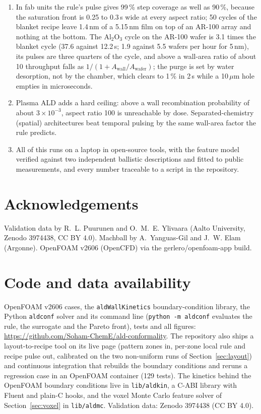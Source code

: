 \documentclass[11pt,letterpaper]{article}
\newcommand{\Awall}{A_{\mathrm{wall}}/A_{\mathrm{wafer}}}
\begin{document}
\begin{enumerate}
\item In fab units the rule's pulse gives 99\,\% step coverage as well as 90\,\%, because the saturation front is 0.25 to 0.3\,s wide at every aspect ratio; 50 cycles of the blanket recipe leave 1.4\,nm of a 5.15\,nm film on top of an AR-100 array and nothing at the bottom. The Al$_2$O$_3$ cycle on the AR-100 wafer is 3.1 times the blanket cycle (37.6 against 12.2\,s; 1.9 against 5.5 wafers per hour for 5\,nm), its pulses are three quarters of the cycle, and above a wall-area ratio of about 10 throughput falls as $1/(1 + \Awall)$; the purge is set by water desorption, not by the chamber, which clears to 1\,\% in 2\,s while a 10\,$\mu$m hole empties in microseconds.
\item Plasma ALD adds a hard ceiling: above a wall recombination probability of about $3\times10^{-3}$, aspect ratio 100 is unreachable by dose. Separated-chemistry (spatial) architectures beat temporal pulsing by the same wall-area factor the rule predicts.
\item All of this runs on a laptop in open-source tools, with the feature model verified against two independent ballistic descriptions and fitted to public measurements, and every number traceable to a script in the repository.
\end{enumerate}

\section*{Acknowledgements}
Validation data by R.~L. Puurunen and O.~M.~E. Ylivaara (Aalto University, Zenodo 3974438, CC BY 4.0). Machball by A.~Yanguas-Gil and J.~W. Elam (Argonne). OpenFOAM v2606 (OpenCFD) via the gerlero/openfoam-app build.

\section*{Code and data availability}
OpenFOAM v2606 cases, the \texttt{aldWallKinetics} boundary-condition library, the Python \texttt{aldconf} solver and its command line (\texttt{python -m aldconf} evaluates the rule, the surrogate and the Pareto front), tests and all figures: \url{https://github.com/Soham-ChemE/ald-conformality}. The repository also ships a layout-to-recipe tool on its live page (pattern zones in, per-zone local rule and recipe pulse out, calibrated on the two non-uniform runs of Section~\ref{sec:layout}) and continuous integration that rebuilds the boundary conditions and reruns a regression case in an OpenFOAM container (129 tests). The kinetics behind the OpenFOAM boundary conditions live in \texttt{lib/aldkin}, a C-ABI library with Fluent and plain-C hooks, and the voxel Monte Carlo feature solver of Section~\ref{sec:voxel} in \texttt{lib/aldmc}. Validation data: Zenodo 3974438 (CC BY 4.0).
\end{document}
